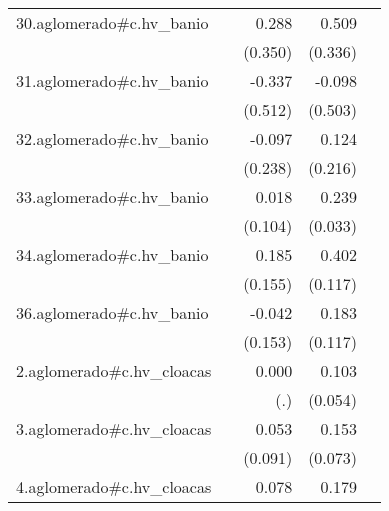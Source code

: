 {\begin{longtable}{l*{4}{D{.}{.}{-1}}}
\addlinespace
30.aglomerado#c.hv\_banio&                     &       0.288         &       0.509         &                     \\
            &                     &     (0.350)         &     (0.336)         &                     \\
\addlinespace
31.aglomerado#c.hv\_banio&                     &      -0.337         &      -0.098         &                     \\
            &                     &     (0.512)         &     (0.503)         &                     \\
\addlinespace
32.aglomerado#c.hv\_banio&                     &      -0.097         &       0.124         &                     \\
            &                     &     (0.238)         &     (0.216)         &                     \\
\addlinespace
33.aglomerado#c.hv\_banio&                     &       0.018         &       0.239\sym{***}&                     \\
            &                     &     (0.104)         &     (0.033)         &                     \\
\addlinespace
34.aglomerado#c.hv\_banio&                     &       0.185         &       0.402\sym{***}&                     \\
            &                     &     (0.155)         &     (0.117)         &                     \\
\addlinespace
36.aglomerado#c.hv\_banio&                     &      -0.042         &       0.183         &                     \\
            &                     &     (0.153)         &     (0.117)         &                     \\
\addlinespace
2.aglomerado#c.hv\_cloacas&                     &       0.000         &       0.103         &                     \\
            &                     &         (.)         &     (0.054)         &                     \\
\addlinespace
3.aglomerado#c.hv\_cloacas&                     &       0.053         &       0.153\sym{*}  &                     \\
            &                     &     (0.091)         &     (0.073)         &                     \\
\addlinespace
4.aglomerado#c.hv\_cloacas&                     &       0.078         &       0.179\sym{***}&                     \\

\end{longtable}}
